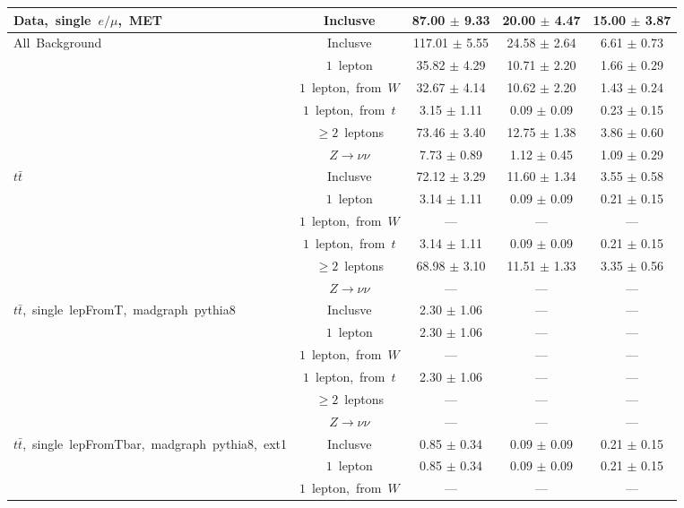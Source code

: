\documentclass{article}
\begin{document}
\begin{longtable}{|l|c|c|c|c|}
\multirow{1}{*}{Data,~single~$e/\mu$,~MET} & Inclusve  & 87.00 $\pm$ 9.33  & 20.00 $\pm$ 4.47  & 15.00 $\pm$ 3.87 \\* 
\hline \hline 
\multirow{6}{*}{All~Background} & Inclusve  & 117.01 $\pm$ 5.55  & 24.58 $\pm$ 2.64  & 6.61 $\pm$ 0.73 \\* 
 & $1$~lepton  & 35.82 $\pm$ 4.29  & 10.71 $\pm$ 2.20  & 1.66 $\pm$ 0.29 \\* 
 & $1$~lepton,~from~$W$  & 32.67 $\pm$ 4.14  & 10.62 $\pm$ 2.20  & 1.43 $\pm$ 0.24 \\* 
 & $1$~lepton,~from~$t$  & 3.15 $\pm$ 1.11  & 0.09 $\pm$ 0.09  & 0.23 $\pm$ 0.15 \\* 
 & $\ge2$~leptons  & 73.46 $\pm$ 3.40  & 12.75 $\pm$ 1.38  & 3.86 $\pm$ 0.60 \\* 
 & $Z\rightarrow\nu\nu$  & 7.73 $\pm$ 0.89  & 1.12 $\pm$ 0.45  & 1.09 $\pm$ 0.29 \\* 
\hline 
\multirow{6}{*}{$t\bar{t}$} & Inclusve  & 72.12 $\pm$ 3.29  & 11.60 $\pm$ 1.34  & 3.55 $\pm$ 0.58 \\* 
 & $1$~lepton  & 3.14 $\pm$ 1.11  & 0.09 $\pm$ 0.09  & 0.21 $\pm$ 0.15 \\* 
 & $1$~lepton,~from~$W$  & ---  & ---  & --- \\* 
 & $1$~lepton,~from~$t$  & 3.14 $\pm$ 1.11  & 0.09 $\pm$ 0.09  & 0.21 $\pm$ 0.15 \\* 
 & $\ge2$~leptons  & 68.98 $\pm$ 3.10  & 11.51 $\pm$ 1.33  & 3.35 $\pm$ 0.56 \\* 
 & $Z\rightarrow\nu\nu$  & ---  & ---  & --- \\* 
\hline 
\multirow{6}{*}{$t\bar{t}$,~single~lepFromT,~madgraph~pythia8} & Inclusve  & 2.30 $\pm$ 1.06  & ---  & --- \\* 
 & $1$~lepton  & 2.30 $\pm$ 1.06  & ---  & --- \\* 
 & $1$~lepton,~from~$W$  & ---  & ---  & --- \\* 
 & $1$~lepton,~from~$t$  & 2.30 $\pm$ 1.06  & ---  & --- \\* 
 & $\ge2$~leptons  & ---  & ---  & --- \\* 
 & $Z\rightarrow\nu\nu$  & ---  & ---  & --- \\* 
\hline 
\multirow{6}{*}{$t\bar{t}$,~single~lepFromTbar,~madgraph~pythia8,~ext1} & Inclusve  & 0.85 $\pm$ 0.34  & 0.09 $\pm$ 0.09  & 0.21 $\pm$ 0.15 \\* 
 & $1$~lepton  & 0.85 $\pm$ 0.34  & 0.09 $\pm$ 0.09  & 0.21 $\pm$ 0.15 \\* 
 & $1$~lepton,~from~$W$  & ---  & ---  & --- \\* 

\end{longtable}
\end{document}
